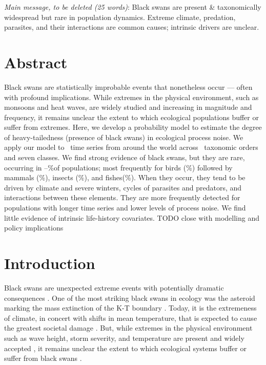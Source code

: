 
\noindent
\emph{Main message, to be deleted (25 words)}: Black swans are present \&
taxonomically widespread but rare in population dynamics. Extreme climate,
predation, parasites, and their interactions are common causes; intrinsic
drivers are unclear.

\section{Abstract}

Black swans are statistically improbable events that nonetheless occur ---
often with profound implications. While extremes in the physical
environment, such as monsoons and heat waves, are widely studied and increasing
in magnitude and frequency, it remains unclear the extent to which ecological
populations buffer or suffer from extremes. Here, we develop a probability
model to estimate the degree of heavy-tailedness (presence of black swans) in
ecological process noise. We apply our model to \NPops~time series from around
the world across \NOrders~taxonomic orders and seven classes. We find strong
evidence of black swans, but they are rare, occurring in
\overallMinPerc--\overallMaxPerc\%of populations; most frequently for birds
(\AvesRangePerc\%) followed by mammals (\MammaliaRangePerc\%), insects
(\InsectaRangePerc\%), and fishes(\OsteichthyesRangePerc\%). When they occur,
they tend to be driven by climate and severe winters, cycles of parasites and
predators, and interactions between these elements. They are more frequently
detected for populations with longer time series and lower levels of process
noise. We find little evidence of intrinsic life-history covariates. TODO close
with modelling and policy implications

\section{Introduction}

Black swans are unexpected extreme events with potentially dramatic
consequences \citep{taleb2007,sornette2009}. One of the most striking black
swans in ecology was the asteroid marking the mass extinction of the K-T
boundary \citep{harnik2012}. Today, it is the extremeness of climate, in
concert with shifts in mean temperature, that is expected to cause the greatest
societal damage \citep{ipcc2012}. But, while extremes in the physical
environment such as wave height, storm severity, and temperature are present and
widely accepted \citep{gaines1993,katz2005}, it remains unclear the extent to
which ecological systems buffer or suffer from black swans \citep{nunez2012}.

